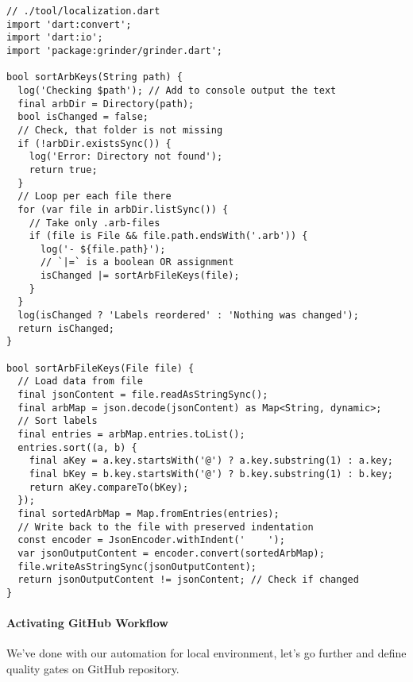 \begin{lstlisting}
// ./tool/localization.dart
import 'dart:convert';
import 'dart:io';
import 'package:grinder/grinder.dart';

bool sortArbKeys(String path) {
  log('Checking $path'); // Add to console output the text
  final arbDir = Directory(path);
  bool isChanged = false;
  // Check, that folder is not missing
  if (!arbDir.existsSync()) {
    log('Error: Directory not found');
    return true;
  }
  // Loop per each file there
  for (var file in arbDir.listSync()) {
    // Take only .arb-files
    if (file is File && file.path.endsWith('.arb')) {
      log('- ${file.path}');
      // `|=` is a boolean OR assignment
      isChanged |= sortArbFileKeys(file);
    }
  }
  log(isChanged ? 'Labels reordered' : 'Nothing was changed');
  return isChanged;
}

bool sortArbFileKeys(File file) {
  // Load data from file
  final jsonContent = file.readAsStringSync();
  final arbMap = json.decode(jsonContent) as Map<String, dynamic>;
  // Sort labels
  final entries = arbMap.entries.toList();
  entries.sort((a, b) {
    final aKey = a.key.startsWith('@') ? a.key.substring(1) : a.key;
    final bKey = b.key.startsWith('@') ? b.key.substring(1) : b.key;
    return aKey.compareTo(bKey);
  });
  final sortedArbMap = Map.fromEntries(entries);
  // Write back to the file with preserved indentation
  const encoder = JsonEncoder.withIndent('    ');
  var jsonOutputContent = encoder.convert(sortedArbMap);
  file.writeAsStringSync(jsonOutputContent);
  return jsonOutputContent != jsonContent; // Check if changed
}
\end{lstlisting}


\paragraph{Activating GitHub Workflow}

We've done with our automation for local environment, let's go further and define quality gates on GitHub repository.

